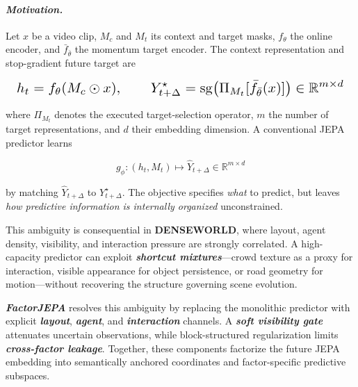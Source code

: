 \paragraph{\textbf{\emph{Motivation.}}}
Let $x$ be a video clip, $M_c$ and $M_t$ its context and target masks,
$f_\theta$ the online encoder, and $\bar f_{\bar\theta}$ the momentum target
encoder. The context representation and stop-gradient future target are

\begin{equation*}
\resizebox{0.98\columnwidth}{!}{$\displaystyle
h_t=f_\theta(M_c\odot x),
\qquad
Y_{t+\Delta}^{\star}
=
\operatorname{sg}\!\left(
\Pi_{M_t}[\bar f_{\bar\theta}(x)]
\right)
\in\mathbb{R}^{m\times d}
$}
\end{equation*}

where $\Pi_{M_t}$ denotes the executed target-selection operator, $m$ the
number of target representations, and $d$ their embedding dimension. A
conventional JEPA predictor learns

\begin{equation*}
g_\phi:(h_t,M_t)
\longmapsto
\widehat{Y}_{t+\Delta}
\in\mathbb{R}^{m\times d}
\end{equation*}

by matching $\widehat{Y}_{t+\Delta}$ to $Y_{t+\Delta}^{\star}$. The objective
specifies \emph{what} to predict, but leaves \emph{how predictive information
is internally organized} unconstrained.

This ambiguity is consequential in \textbf{DENSEWORLD}, where layout, agent
density, visibility, and interaction pressure are strongly correlated. A
high-capacity predictor can exploit \textbf{\emph{shortcut mixtures}}---crowd
texture as a proxy for interaction, visible appearance for object persistence,
or road geometry for motion---without recovering the structure governing scene
evolution.

\textbf{\emph{FactorJEPA}} resolves this ambiguity by replacing the monolithic
predictor with explicit \textbf{\emph{layout}}, \textbf{\emph{agent}}, and
\textbf{\emph{interaction}} channels. A \textbf{\emph{soft visibility gate}}
attenuates uncertain observations, while block-structured regularization limits
\textbf{\emph{cross-factor leakage}}. Together, these components factorize the
future JEPA embedding into semantically anchored coordinates and
factor-specific predictive subspaces.














